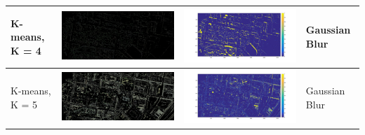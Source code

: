 \documentclass[fleqn,10pt]{SelfArx} %
\begin{document}
\begin{table}
\begin{tabular}{>{\centering\arraybackslash}M{8mm}cc>{\centering\arraybackslash}M{20mm}}
\midrule 
\vspace{-3cm}
\hspace{-0.6cm}
K-means, K = 4 & \includegraphics[clip,scale=0.07]{4rgb.jpg} & \includegraphics[trim={6cm 2.5cm 4.5cm 1.6cm},clip,scale=0.18]{4.jpg} & \vspace{-3cm}Gaussian Blur \\ 
\midrule 
\vspace{-3cm}
\hspace{-0.6cm}
K-means, K = 5 & \includegraphics[clip,scale=0.07]{5rgb.jpg} & \includegraphics[trim={6cm 2.5cm 4.5cm 1.6cm},clip,scale=0.18]{5.jpg} & \vspace{-3cm}Gaussian Blur \\ 

\end{tabular}
\end{table}
\end{document}
